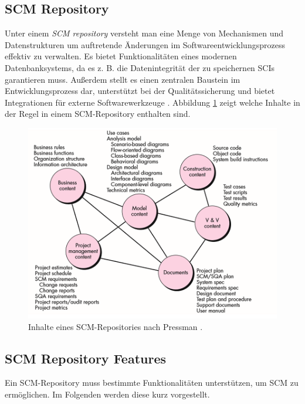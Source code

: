 \documentclass[runningheads,a4paper]{uwsese}
\begin{document}
\subsection{SCM Repository}
Unter einem {\em SCM repository} versteht man eine Menge von Mechanismen und
Datenstrukturen um auftretende Änderungen im Softwareentwicklungsprozess
effektiv zu verwalten. Es bietet Funktionalitäten eines modernen Datenbanksystems,
da es z. B. die Datenintegrität der zu speichernen SCIs garantieren muss.
Außerdem stellt es einen zentralen Baustein im Entwicklungsprozess dar, unterstützt
bei der Qualitätssicherung und bietet Integrationen für externe Softwarewerkzeuge
\cite[p. 590f]{Pressman:2009:SEP:1593949}. Abbildung \ref{fig:scm_repository_content}
zeigt welche Inhalte in der Regel in einem SCM-Repository enthalten sind.

\begin{figure}
\begin{center}
\includegraphics{graphics/scm_respository_content.png}
\caption{Inhalte eines SCM-Repositories nach Pressman
\cite[p. 591]{Pressman:2009:SEP:1593949}.}
\label{fig:scm_repository_content}
\end{center}
\end{figure}

\subsection{SCM Repository Features}
Ein SCM-Repository muss bestimmte Funktionalitäten unterstützen, um SCM
zu ermöglichen. Im Folgenden werden diese kurz vorgestellt.
\end{document}
